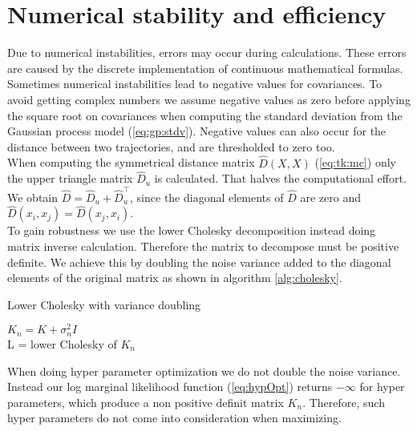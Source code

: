 \section{Numerical stability and efficiency}
Due to numerical instabilities, errors may occur during calculations. These errors are caused by the discrete implementation of continuous mathematical formulas. Sometimes numerical instabilities lead to negative values for covariances. To avoid getting complex numbers we assume negative values as zero before applying the square root on covariances when computing the standard deviation from the Gaussian process model (\ref{eq:gp:stdv}). Negative values can also occur for the distance between two trajectories, and are thresholded to zero too.\\

When computing the symmetrical distance matrix $\hat{D}(X,X)$ (\ref{eq:tk:mc}) only the upper triangle matrix $\hat{D}_{u}$ is calculated. That halves the computational effort. We obtain $\hat{D} = \hat{D}_{u}+\hat{D}_{u}^\top$, since the diagonal elements of $\hat{D}$ are zero and $\hat{D}(x_i,x_j) = \hat{D}(x_j,x_i)$.\\

To gain robustness we use the lower Cholesky decomposition instead doing matrix inverse calculation. Therefore the matrix to decompose must be positive definite. We achieve this by doubling the noise variance added to the diagonal elements of the original matrix as shown in algorithm \ref{alg:cholesky}.

\begin{algorithm}
    \caption{Lower Cholesky with variance doubling\label{alg:cholesky}}
    \BlankLine
    $K_n = K+\sigma_n^2 I$\\
    L = lower Cholesky of $K_n$\\
\end{algorithm}

When doing hyper parameter optimization we do not double the noise variance. Instead our log marginal likelihood function (\ref{eq:hypOpt}) returns $-\infty$ for hyper parameters, which produce a non positive definit matrix $K_n$. Therefore, such hyper parameters do not come into consideration when maximizing.

